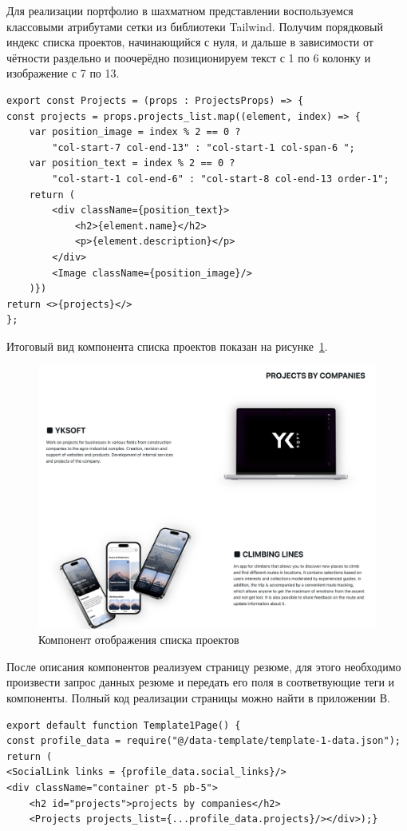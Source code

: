 \documentclass[master, och, diploma]{SCWorks}
\begin{document}
Для реализации портфолио в шахматном представлении воспользуемся классовыми атрибутами сетки из библиотеки Tailwind. Получим порядковый индекс списка проектов, начинающийся с нуля, и дальше в зависимости от чётности раздельно и поочерёдно позиционируем текст с 1 по 6 колонку и изображение с 7 по 13.
\begin{verbatim}
export const Projects = (props : ProjectsProps) => {
const projects = props.projects_list.map((element, index) => {
    var position_image = index % 2 == 0 ? 
        "col-start-7 col-end-13" : "col-start-1 col-span-6 ";
    var position_text = index % 2 == 0 ? 
        "col-start-1 col-end-6" : "col-start-8 col-end-13 order-1";
    return (
        <div className={position_text}>
            <h2>{element.name}</h2>
            <p>{element.description}</p>
        </div>
        <Image className={position_image}/>
    )})
return <>{projects}</>
};
\end{verbatim}

Итоговый вид компонента списка проектов показан на рисунке~\ref{fig:27}. 
\begin{figure}[!ht]
    \centering
    \includegraphics[width=12cm]{images/image-resume-3.png}
    \caption{\label{fig:27}%
        Компонент отображения списка проектов}
\end{figure}

После описания компонентов реализуем страницу резюме, для этого необходимо произвести запрос данных резюме и передать его поля в соответвующие теги и компоненты. Полный код реализации страницы можно найти в приложении В.  
\begin{verbatim}
export default function Template1Page() {
const profile_data = require("@/data-template/template-1-data.json");
return (
<SocialLink links = {profile_data.social_links}/>
<div className="container pt-5 pb-5">
    <h2 id="projects">projects by companies</h2>
    <Projects projects_list={...profile_data.projects}/></div>);}    
\end{verbatim}
\end{document}
